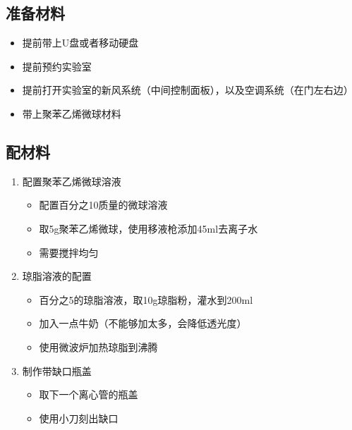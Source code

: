 \documentclass[12pt]{article}
\begin{document}
\subsection{准备材料}
\begin{itemize}
    \item 提前带上U盘或者移动硬盘
    \item 提前预约实验室
    \item 提前打开实验室的新风系统（中间控制面板），以及空调系统（在门左右边）
    \item 带上聚苯乙烯微球材料
\end{itemize}

\subsection{配材料}
\begin{enumerate}
    \item 配置聚苯乙烯微球溶液
    \begin{itemize}
        \item 配置百分之10质量的微球溶液
        \item 取5g聚苯乙烯微球，使用移液枪添加45ml去离子水
        \item 需要搅拌均匀
    \end{itemize}

    \item 琼脂溶液的配置
    \begin{itemize}
        \item 百分之5的琼脂溶液，取10g琼脂粉，灌水到200ml
        \item 加入一点牛奶（不能够加太多，会降低透光度）
        \item 使用微波炉加热琼脂到沸腾
    \end{itemize}

    \item 制作带缺口瓶盖
    \begin{itemize}
        \item 取下一个离心管的瓶盖
        \item 使用小刀刻出缺口
    \end{itemize}
\end{enumerate}
\end{document}
